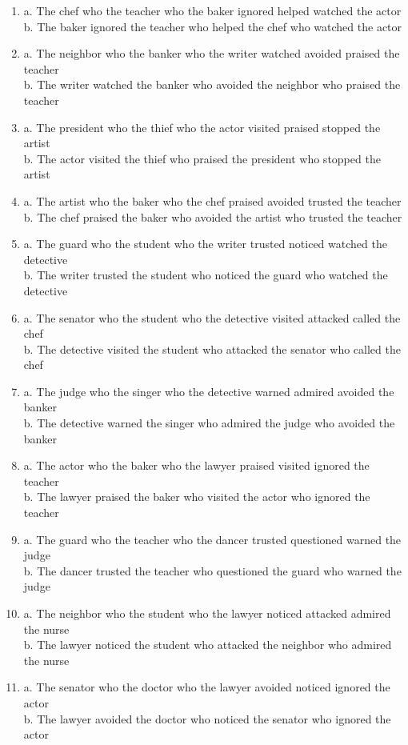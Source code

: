 \documentclass[11pt]{article}
\begin{document}
\begin{enumerate}[label={(\arabic*)}, nosep]
  \item a. The chef who the teacher who the baker ignored helped watched the actor \\ b. The baker ignored the teacher who helped the chef who watched the actor
  \item a. The neighbor who the banker who the writer watched avoided praised the teacher \\ b. The writer watched the banker who avoided the neighbor who praised the teacher
  \item a. The president who the thief who the actor visited praised stopped the artist \\ b. The actor visited the thief who praised the president who stopped the artist
  \item a. The artist who the baker who the chef praised avoided trusted the teacher \\ b. The chef praised the baker who avoided the artist who trusted the teacher
  \item a. The guard who the student who the writer trusted noticed watched the detective \\ b. The writer trusted the student who noticed the guard who watched the detective
  \item a. The senator who the student who the detective visited attacked called the chef \\ b. The detective visited the student who attacked the senator who called the chef
  \item a. The judge who the singer who the detective warned admired avoided the banker \\ b. The detective warned the singer who admired the judge who avoided the banker
  \item a. The actor who the baker who the lawyer praised visited ignored the teacher \\ b. The lawyer praised the baker who visited the actor who ignored the teacher
  \item a. The guard who the teacher who the dancer trusted questioned warned the judge \\ b. The dancer trusted the teacher who questioned the guard who warned the judge
  \item a. The neighbor who the student who the lawyer noticed attacked admired the nurse \\ b. The lawyer noticed the student who attacked the neighbor who admired the nurse
  \item a. The senator who the doctor who the lawyer avoided noticed ignored the actor \\ b. The lawyer avoided the doctor who noticed the senator who ignored the actor

\end{enumerate}
\end{document}

